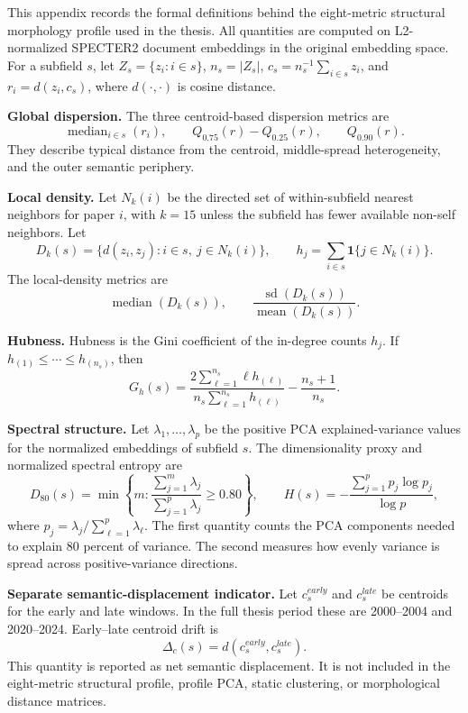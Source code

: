
\label{app:metric-formulations}

\noindent This appendix records the formal definitions behind the eight-metric structural morphology profile used in the thesis. All quantities are computed on L2-normalized SPECTER2 document embeddings in the original embedding space. For a subfield \(s\), let \(Z_s=\{z_i:i\in s\}\), \(n_s=|Z_s|\), \(c_s=n_s^{-1}\sum_{i\in s}z_i\), and \(r_i=d(z_i,c_s)\), where \(d(\cdot,\cdot)\) is cosine distance.

\medskip
\noindent\textbf{Global dispersion.} The three centroid-based dispersion metrics are
\[
\operatorname{median}_{i\in s}(r_i), \qquad
Q_{0.75}(r)-Q_{0.25}(r), \qquad
Q_{0.90}(r).
\]
They describe typical distance from the centroid, middle-spread heterogeneity, and the outer semantic periphery.

\medskip
\noindent\textbf{Local density.} Let \(N_k(i)\) be the directed set of within-subfield nearest neighbors for paper \(i\), with \(k=15\) unless the subfield has fewer available non-self neighbors. Let
\[
D_k(s)=\{d(z_i,z_j): i\in s,\ j\in N_k(i)\},
\qquad
h_j=\sum_{i\in s}\mathbf{1}\{j\in N_k(i)\}.
\]
The local-density metrics are
\[
\operatorname{median}(D_k(s)),
\qquad
\frac{\operatorname{sd}(D_k(s))}{\operatorname{mean}(D_k(s))}.
\]

\medskip
\noindent\textbf{Hubness.}
Hubness is the Gini coefficient of the in-degree counts \(h_j\). If \(h_{(1)}\leq\cdots\leq h_{(n_s)}\), then
\[
G_h(s)=\frac{2\sum_{\ell=1}^{n_s}\ell h_{(\ell)}}{n_s\sum_{\ell=1}^{n_s}h_{(\ell)}}-\frac{n_s+1}{n_s}.
\]

\medskip
\noindent\textbf{Spectral structure.} Let \(\lambda_1,\ldots,\lambda_p\) be the positive PCA explained-variance values for the normalized embeddings of subfield \(s\). The dimensionality proxy and normalized spectral entropy are
\[
D_{80}(s)=\min\left\{m:\frac{\sum_{j=1}^{m}\lambda_j}{\sum_{j=1}^{p}\lambda_j}\geq 0.80\right\},
\qquad
H(s)=-\frac{\sum_{j=1}^{p}p_j\log p_j}{\log p},
\]
where \(p_j=\lambda_j/\sum_{\ell=1}^{p}\lambda_\ell\). The first quantity counts the PCA components needed to explain 80 percent of variance. The second measures how evenly variance is spread across positive-variance directions.

\medskip
\noindent\textbf{Separate semantic-displacement indicator.} Let \(c_s^{early}\) and \(c_s^{late}\) be centroids for the early and late windows. In the full thesis period these are 2000--2004 and 2020--2024. Early--late centroid drift is
\[
\Delta_c(s)=d(c_s^{early},c_s^{late}).
\]
This quantity is reported as net semantic displacement. It is not included in the eight-metric structural profile, profile PCA, static clustering, or morphological distance matrices.
